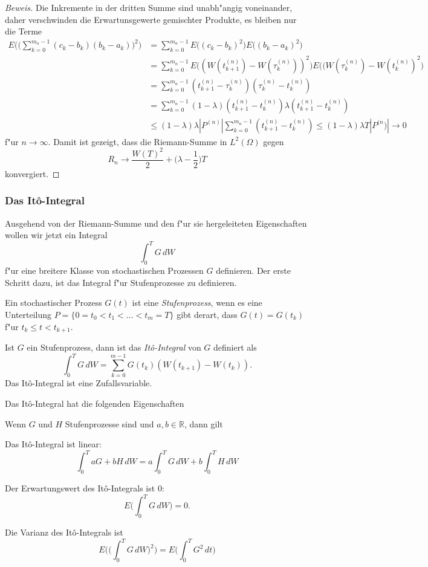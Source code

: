 \begin{proof}[Beweis]
Die Inkremente in der dritten Summe sind unabh"angig voneinander, daher
verschwinden die Erwartunsgewerte gemischter Produkte, es bleiben nur
die Terme
\begin{align*}
E\biggl(\biggl(\sum_{k=0}^{m_n-1}(c_k-b_k)(b_k-a_k)\biggr)^2\biggr)
&=
\sum_{k=0}^{m_n-1}
E\bigl((c_k-b_k)^2\bigr)E\bigl((b_k-a_k)^2\bigr)
\\
&=
\sum_{k=0}^{m_n-1}
E\bigl((W(t_{k+1}^{(n)})-W(\tau_k^{(n)}))^2\bigr)E\bigl((W(\tau_k^{(n)})-W(t_k^{(n)})^2\bigr)
\\
&=
\sum_{k=0}^{m_n-1}
(t_{k+1}^{(n)}-\tau_k^{(n)}) (\tau_k^{(n)}-t_k^{(n)})
\\
&=
\sum_{k=0}^{m_n-1}
(1-\lambda)(t_{k+1}^{(n)}-t_k^{(n)}) \lambda(t_{k+1}^{(n)}-t_k^{(n)})
\\
&\le 
(1-\lambda)\lambda
|P^{(n)}|
\sum_{k=0}^{m_n-1}
(t_{k+1}^{(n)}-t_k^{(n)})
\le (1-\lambda)\lambda T|P^{(n})|\to 0
\end{align*}
f"ur $n\to\infty$.
Damit ist gezeigt, dass die Riemann-Summe in $L^2(\Omega)$ gegen
\[
R_n\to
\frac{W(T)^2}2+\biggl(\lambda-\frac12\biggr)T
\]
konvergiert.
\end{proof}

\subsubsection{Das It\^o-Integral}
Ausgehend von der Riemann-Summe und den f"ur sie hergeleiteten Eigenschaften
wollen wir jetzt ein Integral
\[
\int_0^T G\,dW
\]
f"ur eine breitere Klasse von stochastischen Prozessen $G$ definieren.
Der erste Schritt dazu, ist das Integral f"ur Stufenprozesse zu definieren.

\begin{definition}
Ein stochastischer Prozess $G(t)$ ist eine {\em Stufenprozess}, wenn es eine
Unterteilung $P=\{0=t_0<t_1<\dots<t_m=T\}$ gibt derart, dass
$G(t)=G(t_k)$ f"ur $t_k\le t<t_{k+1}$.
\end{definition}

\begin{definition}
Ist $G$ ein Stufenprozess, dann ist das {\em It\^o-Integral} von $G$ definiert
als
\[
\int_0^TG\,dW = \sum_{k=0}^{m-1}G(t_k)(W(t_{k+1})-W(t_k)).
\]
Das It\^o-Integral ist eine Zufallsvariable.
\end{definition}

Das It\^o-Integral hat die folgenden Eigenschaften
\begin{hilfssatz}
Wenn $G$ und $H$ Stufenprozesse sind und $a,b\in\mathbb R$, dann gilt
\begin{compactenum}
\item Das It\^o-Integral ist linear:
\[
\int_0^T aG+bH\,dW
=
a\int_0^T G\,dW + b \int_0^TH\,dW
\]
\item Der Erwartungswert des It\^o-Integrals ist $0$:
\[
E\biggl(\int_0^T G\,dW\biggr)=0.
\]
\item Die Varianz des It\^o-Integrals ist
\[
E\biggl(\biggl(\int_0^T G\,dW\biggr)^2\biggr)
=
E\biggl(\int_0^T G^2\,dt\biggr)
\]
\end{compactenum}
\end{hilfssatz}

